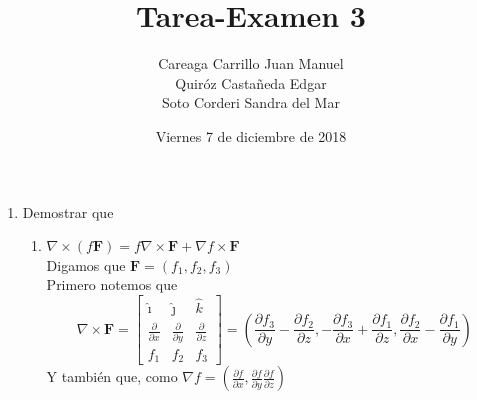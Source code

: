 \documentclass{article}
\begin{document}
    \title{Tarea-Examen 3}
    \author{Careaga Carrillo Juan Manuel\\
            Quiróz Castañeda Edgar\\
            Soto Corderi Sandra del Mar}
    \date{Viernes 7 de diciembre de 2018}
    \maketitle
    \begin{enumerate}

        \item {
            Demostrar que

            \begin{enumerate}
            \item{
                $\nabla \times (f \mathbf{F}) =
                f \nabla \times \mathbf{F} + \nabla f \times \mathbf{F}$\\
                \color{azul}
                    Digamos que $\mathbf{F} = (f_1, f_2, f_3)$\\
                    Primero notemos que
                    \[\nabla \times \mathbf{F} =
                    \begin{bmatrix}
                        \hat{\imath} & \hat{\jmath} & \hat{k} \\
                        \frac{\partial}{\partial x} & \frac{\partial}{\partial y}
                         & \frac{\partial}{\partial z} \\
                         f_1 & f_2 & f_3
                    \end{bmatrix} =
                    (
                    \frac{\partial f_3}{\partial y}
                    - \frac{\partial f_2}{\partial z},
                    -\frac{\partial f_3}{\partial x}
                    +\frac{\partial f_1}{\partial z},
                    \frac{\partial f_2}{\partial x}
                    -\frac{\partial f_1}{\partial y}
                    )
                    \]
                    Y también que, como $\nabla f =
                    (\frac{\partial f}{\partial x},
                    \frac{\partial f}{\partial y}
                    \frac{\partial f}{\partial z})$

}
\end{enumerate}}
\end{enumerate}
\end{document}
